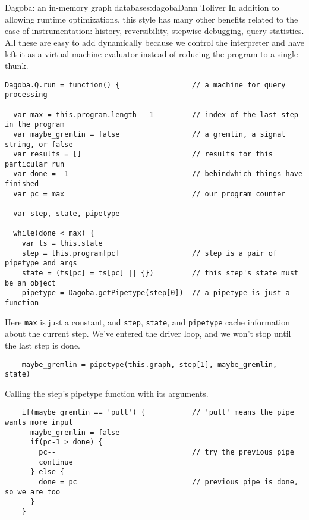 \begin{aosachapter}{Dagoba: an in-memory graph database}{s:dagoba}{Dann Toliver}
In addition to allowing runtime optimizations, this style has many other
benefits related to the ease of instrumentation: history, reversibility,
stepwise debugging, query statistics. All these are easy to add
dynamically because we control the interpreter and have left it as a
virtual machine evaluator instead of reducing the program to a single
thunk.

\label{interpreter-unveiled}

\begin{verbatim}
Dagoba.Q.run = function() {                 // a machine for query processing

  var max = this.program.length - 1         // index of the last step in the program
  var maybe_gremlin = false                 // a gremlin, a signal string, or false
  var results = []                          // results for this particular run
  var done = -1                             // behindwhich things have finished
  var pc = max                              // our program counter

  var step, state, pipetype

  while(done < max) {
    var ts = this.state
    step = this.program[pc]                 // step is a pair of pipetype and args
    state = (ts[pc] = ts[pc] || {})         // this step's state must be an object
    pipetype = Dagoba.getPipetype(step[0])  // a pipetype is just a function
\end{verbatim}

Here \texttt{max} is just a constant, and \texttt{step}, \texttt{state},
and \texttt{pipetype} cache information about the current step. We've
entered the driver loop, and we won't stop until the last step is done.

\begin{verbatim}
    maybe_gremlin = pipetype(this.graph, step[1], maybe_gremlin, state)
\end{verbatim}

Calling the step's pipetype function with its arguments.

\begin{verbatim}
    if(maybe_gremlin == 'pull') {           // 'pull' means the pipe wants more input
      maybe_gremlin = false
      if(pc-1 > done) {
        pc--                                // try the previous pipe
        continue
      } else {
        done = pc                           // previous pipe is done, so we are too
      }
    }
\end{verbatim}


\end{aosachapter}
